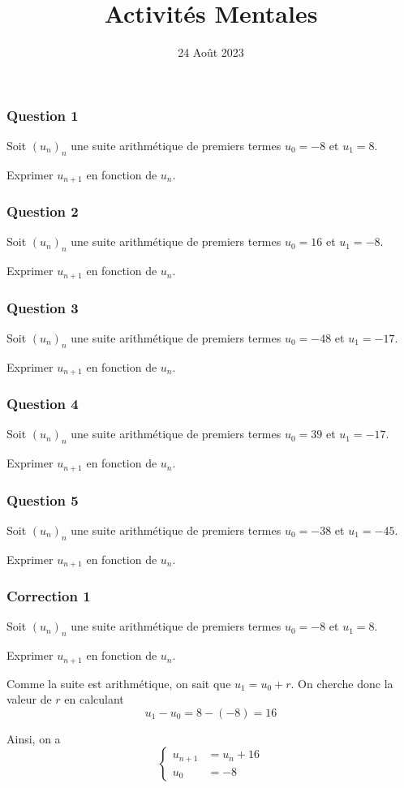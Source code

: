 \documentclass[15pt, mathserif]{beamer}
\title{Activités Mentales}
\date{24 Août 2023}
\begin{document}
\begin{frame}
    \titlepage
\end{frame}

\begin{frame} 
	\frametitle{Question 1}
Soit $(u_n)_n$ une suite arithmétique de premiers termes $u_0=-8$ et $u_1=8$. 
 
 Exprimer $u_{n+1}$ en fonction de $u_n$.\end{frame}


\begin{frame} 
	\frametitle{Question 2}
Soit $(u_n)_n$ une suite arithmétique de premiers termes $u_0=16$ et $u_1=-8$. 
 
 Exprimer $u_{n+1}$ en fonction de $u_n$.\end{frame}


\begin{frame} 
	\frametitle{Question 3}
Soit $(u_n)_n$ une suite arithmétique de premiers termes $u_0=-48$ et $u_1=-17$. 
 
 Exprimer $u_{n+1}$ en fonction de $u_n$.\end{frame}


\begin{frame} 
	\frametitle{Question 4}
Soit $(u_n)_n$ une suite arithmétique de premiers termes $u_0=39$ et $u_1=-17$. 
 
 Exprimer $u_{n+1}$ en fonction de $u_n$.\end{frame}


\begin{frame} 
	\frametitle{Question 5}
Soit $(u_n)_n$ une suite arithmétique de premiers termes $u_0=-38$ et $u_1=-45$. 
 
 Exprimer $u_{n+1}$ en fonction de $u_n$.\end{frame}


\begin{frame}
\vspace{-10mm}
	\frametitle{Correction 1}
Soit $(u_n)_n$ une suite arithmétique de premiers termes $u_0=-8$ et $u_1=8$. 
 
 Exprimer $u_{n+1}$ en fonction de $u_n$. 
 
 \vspace*{1cm} 
 
 Comme la suite est arithmétique, on sait que $u_1=u_0+r$. On cherche donc la valeur de $r$ en calculant $$u_1-u_0=8-\left(-8\right)=16$$ 
 
 Ainsi, on a $$ \left\{ 
 \begin{array}{ll} 
 u_{n+1} &= u_n +16 \\ 
 u_0 & = -8 
 \end{array} 
 \right. $$ 
 \end{frame}
\end{document}
